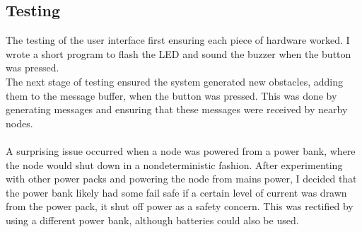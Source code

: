 \documentclass[12pt,a4paper]{report}
\begin{document}
\subsection{Testing}
The testing of the user interface first ensuring each piece of hardware worked. I wrote a short program to flash the LED and sound the buzzer when the button was pressed. \\
The next stage of testing ensured the system generated new obstacles, adding them to the message buffer, when the button was pressed. This was done by generating messages and ensuring that these messages were received by nearby nodes.  \\ \\
A surprising issue occurred when a node was powered from a power bank, where the node would shut down in a nondeterministic fashion. After experimenting with other power packs and powering the node from mains power, I decided that the power bank likely had some fail safe if a certain level of current was drawn from the power pack, it shut off power as a safety concern. This was rectified by using a different power bank, although batteries could also be used.  
\end{document}
